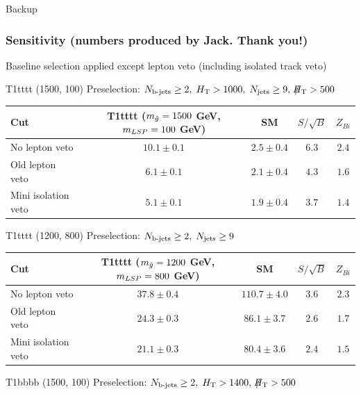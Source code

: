\documentclass{beamer}
\begin{document}
\begin{frame}
 \begin{block}{}
 \centering
 \Large Backup
 \end{block}
\end{frame}

\begin{frame}
 \frametitle{Sensitivity (numbers produced by Jack. Thank you!)}

\small Baseline selection applied except lepton veto (including isolated track veto)
 \Tiny
 \begin{center}
 \Tiny
T1tttt (1500, 100) Preselection: $N_{\text{b-jets}}\geq2,\;H_{\text{T}}>1000,\;N_{\text{jets}}\geq9,\;\slash\mkern-12mu{H}_{\text{T}}>500$

  \begin{tabular}{lcccc}
    \hline
    \hline
    Cut & T1tttt ($m_{\tilde{g}}=1500$ GeV, $m_{LSP}=100$ GeV) & SM & $S/\sqrt{B}$ & $Z_{Bi}$ \\ \hline
No lepton veto & $10.1 \pm 0.1$ & $2.5 \pm 0.4$ &  $6.3$ & $2.4$  \\\hline
Old lepton veto & $6.1 \pm 0.1$ & $2.1 \pm 0.4$ &  $4.3$ & $1.6$  \\
Mini isolation veto & $5.1 \pm 0.1$ & $1.9 \pm 0.4$ &  $3.7$ & $1.4$  \\
    \hline
    \hline
  \end{tabular}
  \end{center}
  
  \begin{center}
 \Tiny T1tttt (1200, 800) Preselection: $N_{\text{b-jets}}\geq2,\;N_{\text{jets}}\geq9$

 \begin{tabular}{lcccc}
    \hline
    \hline
    Cut & T1tttt ($m_{\tilde{g}}=1200$ GeV, $m_{LSP}=800$ GeV) & SM & $S/\sqrt{B}$ & $Z_{Bi}$ \\ \hline
No lepton veto & $37.8 \pm 0.4$ & $110.7 \pm 4.0$ &  $3.6$ & $2.3$  \\\hline
Old lepton veto & $24.3 \pm 0.3$ & $86.1 \pm 3.7$ &  $2.6$ & $1.7$  \\
Mini isolation veto & $21.1 \pm 0.3$ & $80.4 \pm 3.6$ &  $2.4$ & $1.5$  \\
    \hline
    \hline
  \end{tabular}
   \end{center}
   
  \begin{center}
 \Tiny T1bbbb (1500, 100) Preselection: $N_{\text{b-jets}}\geq2,\;H_{\text{T}}>1400,\;\slash\mkern-12mu{H}_{\text{T}}>500$


\end{center}
\end{frame}
\end{document}
